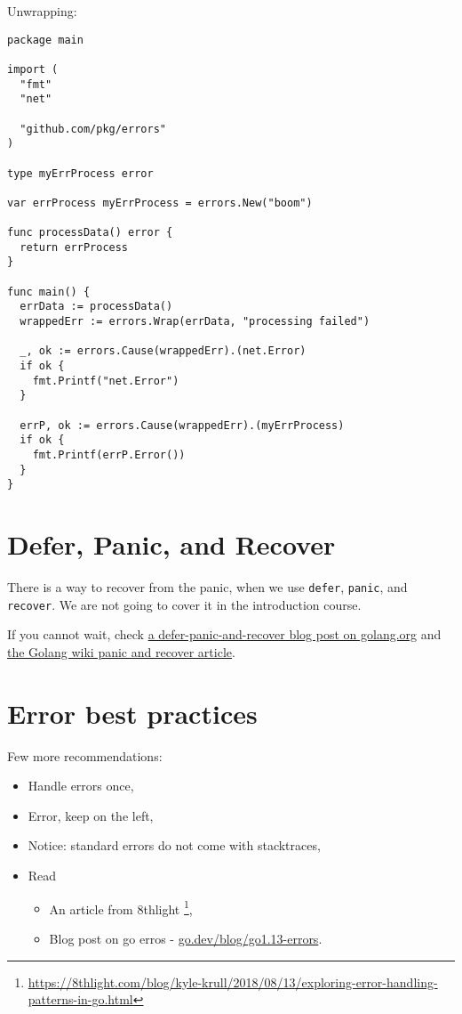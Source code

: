 \documentclass[11pt, letterpaper]{article}
\begin{document}
Unwrapping:

\begin{verbatim}
package main

import (
  "fmt"
  "net"

  "github.com/pkg/errors"
)

type myErrProcess error

var errProcess myErrProcess = errors.New("boom")

func processData() error {
  return errProcess
}

func main() {
  errData := processData()
  wrappedErr := errors.Wrap(errData, "processing failed")

  _, ok := errors.Cause(wrappedErr).(net.Error)
  if ok {
    fmt.Printf("net.Error")
  }

  errP, ok := errors.Cause(wrappedErr).(myErrProcess)
  if ok {
    fmt.Printf(errP.Error())
  }
}
\end{verbatim}

\section{Defer, Panic, and Recover}

There is a way to recover from the panic, when we use \texttt{defer}, \texttt{panic}, and \texttt{recover}. We are not going to cover it in the introduction course.

If you cannot wait, check \href{https://blog.golang.org/defer-panic-and-recover}{a defer-panic-and-recover blog post on golang.org} and \href{https://github.com/golang/go/wiki/PanicAndRecover}{the Golang wiki panic and recover article}.

\section{Error best practices}

Few more recommendations:

\begin{itemize}
\item Handle errors once,
\item Error, keep on the left,
\item Notice: standard errors do not come with stacktraces,
\item Read \begin{itemize}
\item An article from 8thlight \footnote{\href{https://8thlight.com/blog/kyle-krull/2018/08/13/exploring-error-handling-patterns-in-go.html}{https://8thlight.com/blog/kyle-krull/2018/08/13/exploring-error-handling-patterns-in-go.html}},
\item Blog post on go erros - \href{https://go.dev/blog/go1.13-errors}{go.dev/blog/go1.13-errors}.
\end{itemize}
\end{itemize}
\end{document}
